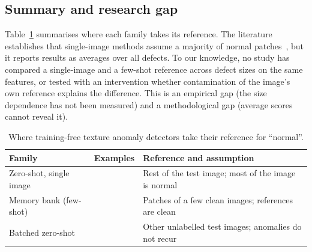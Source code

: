 \subsection{Summary and research gap}
Table~\ref{tab:lit} summarises where each family takes its reference. The
literature establishes that single-image methods assume a majority of
normal patches~\cite{aota2023zeroshot,ardelean2024highfidelity}, but it
reports results as averages over all defects. To our knowledge, no study has
compared a single-image and a few-shot reference across defect sizes on the
same features, or tested with an intervention whether contamination of the
image's own reference explains the difference. This is an empirical gap
(the size dependence has not been measured) and a methodological gap
(average scores cannot reveal it).

\begin{table}[t]
\centering
\caption{Where training-free texture anomaly detectors take their reference
for ``normal''.}
\label{tab:lit}
\footnotesize
\setlength{\tabcolsep}{3pt}
\begin{tabular}{>{\raggedright\arraybackslash}p{2.0cm}>{\raggedright\arraybackslash}p{1.5cm}>{\raggedright\arraybackslash}p{4.3cm}}
\toprule
Family & Examples & Reference and assumption \\
\midrule
Zero-shot, single image & \cite{aota2023zeroshot,ardelean2024highfidelity,yao2025grnr,zhang2025nlpa}
  & Rest of the test image; most of the image is normal \\
Memory bank (few-shot) & \cite{roth2022patchcore,damm2025anomalydino,lendering2026subspacead}
  & Patches of a few clean images; references are clean \\
Batched zero-shot & \cite{li2024musc,legia2025consistent}
  & Other unlabelled test images; anomalies do not recur \\
\bottomrule
\end{tabular}
\end{table}
